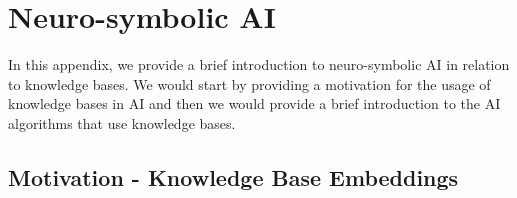 

%
\chapter*{\thechapter \quad Neuro-symbolic AI}
\label{appendixB}
In this appendix, we provide a brief introduction to neuro-symbolic AI in relation to knowledge bases.
We would start by providing a motivation for the usage of knowledge bases in AI and then we would
provide a brief introduction to the AI algorithms that use knowledge bases.

\section{Motivation - Knowledge Base Embeddings}

